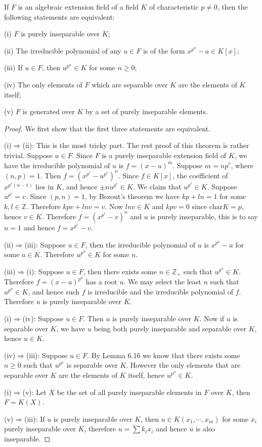 \begin{theorem}
If $F$ is an algebraic extension field of a field $K$ of characteristic $p\ne 0$, then the following statements are equivalent:\par
(i) $F$ is purely inseparable over $K$;\par
(ii) The irreducible polynomial of any $u\in F$ is of the form $x^{p^n}-a\in K[x]$;\par
(iii) If $u\in F$, then $u^{p^n}\in K$ for some $n\ge 0$;\par
(iv) The only elements of $F$ which are separable over $K$ are the elements of $K$ itself;\par
(v) $F$ is generated over $K$ by a set of purely inseparable elements.
\end{theorem}
\begin{proof}
We first show that the first three statements are equivalent.\par
(i)$\Rightarrow$(ii): This is the most tricky part. The rest proof of this theorem is rather trivial. Suppose $u\in F$. Since $F$ is a purely inseparable extension field of $K$, we have the irreducible polynomial of $u$ is $f=(x-u)^m$. Suppose $m=np^r$, where $(n,p)=1$. Then $f=(x^{p^r}-u^{p^r})^n$. Since $f\in K[x]$, the coefficient of $x^{p^r(n-1)}$ lies in $K$, and hence $\pm nu^{p^r}\in K$. We claim that $u^{p^r}\in K$. Suppose $u^{p^r}=v$. Since $(p,n)=1$, by Bezout's theorem we have $kp+ln=1$ for some $k,l\in\mathbb{Z}$. Therefore $kpv+lnv=v$. Now $lnv\in K$ and $kpv=0$ since $\mathrm{char}K=p$, hence $v\in K$. Therefore $f=(x^{p^r}-v)^n$ and $u$ is purely inseparable, this is to say $n=1$ and hence $f=x^{p^r}-v$.\par
(ii)$\Rightarrow$(iii): Suppose $u\in F$, then the irreducible polynomial of $u$ is $x^{p^n}-a$ for some $a\in K$. Therefore $u^{p^n}\in K$ for some $n$.\par
(iii)$\Rightarrow$(i): Suppose $u\in F$, then there exists some $n\in\mathbb{Z}_+$ such that $u^{p^n}\in K$. Therefore $f=(x-u)^{p^n}$ has a root $u$. We may select the least $n$ such that $u^{p^n}\in K$, and hence such $f$ is irreducible and the irreducible polynomial of $f$. Therefore $u$ is purely inseparable over $K$.\par
(i)$\Rightarrow$(iv): Suppose $u\in F$. Then $u$ is purely inseparable over $K$. Now if $u$ is separable over $K$, we have $u$ being both purely inseparable and separable over $K$, hence $u\in K$.\par
(iv)$\Rightarrow$(iii): Suppose $u\in F$. By Lemma 6.16 we know that there exists some $n\ge 0$ such that $u^{p^n}$ is separable over $K$. However the only elements that are separable over $K$ are the elements of $K$ itself, hence $u^{p^n}\in K$.\par
(i)$\Rightarrow$(v): Let $X$ be the set of all purely inseparable elements in $F$ over $K$, then $F=K(X)$.\par
(v)$\Rightarrow$(iii): If $u$ is purely inseparable over $K$, then $u\in K(x_1,\cdots,x_m)$ for some $x_i$ purely inseparable over $K$, therefore $u=\sum k_ix_i$ and hence $u$ is also inseparable.
\end{proof}
